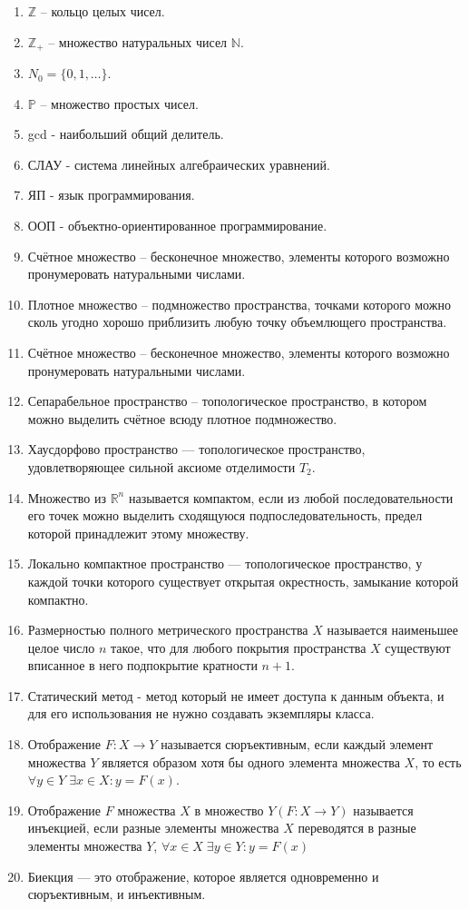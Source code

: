 \documentclass[master, och, diploma, times]{sty/SCWorks}
\theoremstyle{plain}
\theoremstyle{definition}
\numberwithin{equation}{section}
\begin{document}
\begin{enumerate}
	\item $\mathbb {Z}$ -- кольцо целых чисел.
	\item $\mathbb {Z}_{+}$ -- множество натуральных чисел $\mathbb {N}$.
	\item ${N}_0=\{0,1,\dots\}$.
	\item $\mathbb {P}$ -- множество простых чисел.
	\item gcd - наибольший общий делитель.
	\item СЛАУ - система линейных алгебраических уравнений.
	\item ЯП - язык программирования.
	\item ООП - объектно-ориентированное программирование.
	\item Счётное множество -- бесконечное множество, элементы которого возможно пронумеровать натуральными числами.
	\item Плотное множество -- подмножество пространства, точками которого можно сколь угодно хорошо приблизить любую точку объемлющего пространства.
	\item Счётное множество -- бесконечное множество, элементы которого возможно пронумеровать натуральными числами.
	\item Сепарабельное пространство -- топологическое пространство, в котором можно выделить счётное всюду плотное подмножество.
	\item Хаусдорфово пространство — топологическое пространство, удовлетворяющее сильной аксиоме отделимости $T_2$.
	\item Множество из $\mathbb {R}^n$ называется компактом, если из любой последовательности его точек можно выделить сходящуюся подпоследовательность, предел которой принадлежит этому множеству.
	\item Локально компактное пространство — топологическое пространство, у каждой точки которого существует открытая окрестность, замыкание которой компактно.
	\item Размерностью полного метрического пространства $X$ называется наименьшее целое число $n$ такое, что для любого покрытия пространства $X$ существуют вписанное в него подпокрытие кратности $n+1$.
	\item Статический метод - метод который не имеет доступа к данным объекта, и для его использования не нужно создавать экземпляры класса.
	\item Отображение $F:X \to Y$ называется сюръективным, если каждый элемент множества $Y$ является образом хотя бы одного элемента множества $X$, то есть $\forall y \in Y \; \exists x \in X : y=F(x)$.
	\item Отображение $F$ множества $X$ в множество $Y(F: X \to Y)$ называется инъекцией, если разные элементы множества $X$ переводятся в разные элементы множества $Y$, $\forall x \in X \; \exists y \in Y : y=F(x)$
	\item Биекция — это отображение, которое является одновременно и сюръективным, и инъективным\cite{bib:number:tyapaev}.
\end{enumerate}
\end{document}
